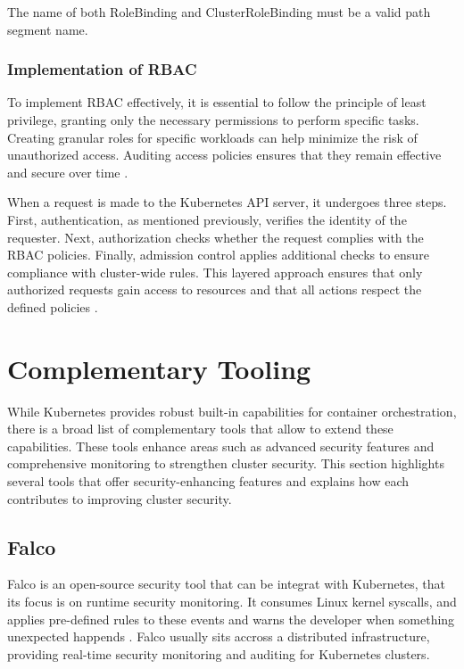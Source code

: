 \documentclass[a4paper,11pt,openright,BCOR=15mm]{scrbook}
\begin{document}
The name of both RoleBinding and ClusterRoleBinding must be a valid path segment name.
	

\subsection{Implementation of RBAC}

To implement RBAC effectively, it is essential to follow the principle of least privilege, granting only the necessary permissions to perform specific tasks. Creating granular roles for specific workloads can help minimize the risk of unauthorized access. Auditing access policies ensures that they remain effective and secure over time \cite{rostami_role-based_2023}.

When a request is made to the Kubernetes API server, it undergoes three steps. First, authentication, as mentioned previously, verifies the identity of the requester. Next, authorization checks whether the request complies with the RBAC policies. Finally, admission control applies additional checks to ensure compliance with cluster-wide rules. This layered approach ensures that only authorized requests gain access to resources and that all actions respect the defined policies \cite{the_linux_foundation_rbacauthorization_2024}.




		
\chapter{Complementary Tooling}\label{chapt:comp}

While Kubernetes provides robust built-in capabilities for container orchestration, there is a broad list of complementary tools that allow to extend these capabilities.  These tools enhance areas such as advanced security features and comprehensive monitoring to strengthen cluster security. This section highlights several tools that offer security-enhancing features and explains how each contributes to improving cluster security.

\section{Falco}\label{sect:complementNetSec}

Falco is an open-source security tool that can be integrat with Kubernetes, that its focus is on runtime security monitoring. It consumes Linux kernel syscalls, and applies pre-defined rules to these events and warns the developer when something unexpected happends \cite{falco_about_page}. Falco usually sits accross a distributed infrastructure, providing real-time security monitoring and auditing for Kubernetes clusters.
\end{document}
